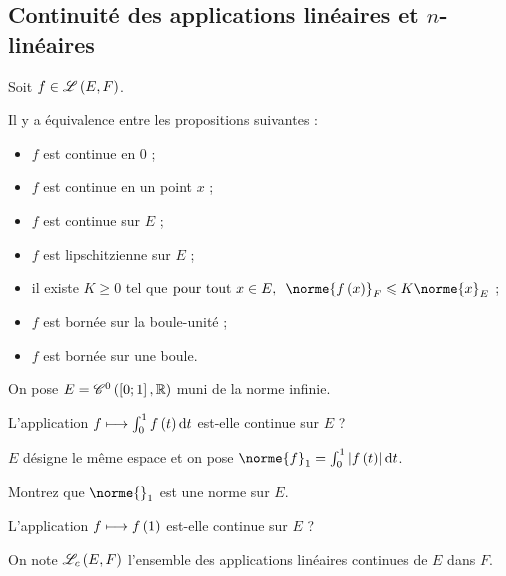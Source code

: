 \subsection{Continuité des applications linéaires et \(n\)-linéaires}

\begin{prop}
Soit \(f\in\mathscr{L}\left(E,F\right)\).

Il y a équivalence entre les propositions suivantes :

\begin{itemize}
    \item \(f\) est continue en \(0\) ; \\
    \item \(f\) est continue en un point \(x\) ; \\
    \item \(f\) est continue sur \(E\) ; \\
    \item \(f\) est lipschitzienne sur \(E\) ; \\
    \item il existe \(K\geq 0\) tel que \(\quantifs{\tpt x\in E}\norme{f\paren{x}}_F\leq K\norme{x}_E\) ; \\
    \item \(f\) est bornée sur la boule-unité ; \\
    \item \(f\) est bornée sur une boule.
\end{itemize}
\end{prop}

\begin{exo}
On pose \(E=\mathscr{C}^{0}\left(\left[0;1\right],\mathbb{R}\right)\) muni de la norme infinie.

L'application \(f\mapsto\int_0^1f\paren{t}\odif{t}\) est-elle continue sur \(E\) ?
\end{exo}

\begin{exo}
\(E\) désigne le même espace et on pose \(\norme{f}_1=\int_0^1\abs{f\paren{t}}\odif{t}\).

Montrez que \(\norme{}_1\) est une norme sur \(E\).

L'application \(f\longmapsto f\left(1\right)\) est-elle continue sur \(E\) ?
\end{exo}

\begin{defi}
On note \(\mathscr{L}_c\left(E,F\right)\) l'ensemble des applications linéaires continues de \(E\) dans \(F\).
\end{defi}

